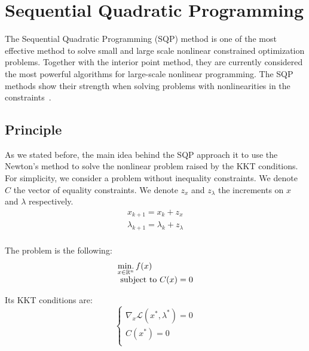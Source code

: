 \section{Sequential Quadratic Programming}
\label{sec:sequential_quadratic_programming}

The Sequential Quadratic Programming (SQP) method is one of the most effective method to solve small and large scale nonlinear constrained optimization problems.
Together with the interior point method, they are currently considered the most powerful algorithms for large-scale nonlinear programming.
The SQP methods show their strength when solving problems with nonlinearities in the constraints~\cite{nocedal:book:2006}.

\subsection{Principle}
\label{sub:principle}

As we stated before, the main idea behind the SQP approach it to use the Newton's method to solve the nonlinear problem raised by the KKT conditions.
For simplicity, we consider a problem without inequality constraints.
We denote $C$ the vector of equality constraints.
We denote $z_x$ and $z_\lambda$ the increments on $x$ and $\lambda$ respectively.
\begin{equation}
  \begin{array}{l}
    x_{k+1} = x_k + z_x\\
    \lambda_{k+1} = \lambda_k+z_\lambda\\
  \end{array}
\end{equation}

The problem is the following:
\begin{equation}
  \begin{array}{l}
    \operatorname*{min.}\limits_{x\in\mathbb{R}^n}{f(x)} \\
    \text{ subject to } C(x) = 0
  \end{array}
\end{equation}

Its KKT conditions are:
\begin{equation}
  \label{KKT_equ}
  \left\{
\begin{array}{ll}
  \nabla_x\mathcal{L}(x^*,\lambda^*) = 0\\
  C(x^*) = 0\\
\end{array}
\right.
\end{equation}

